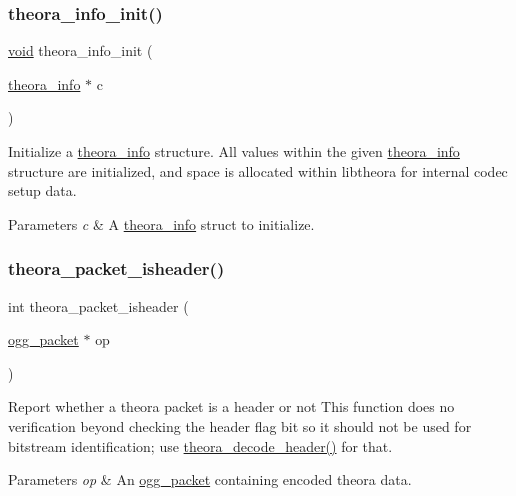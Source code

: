 \subsubsection{\texorpdfstring{theora\+\_\+info\+\_\+init()}{theora\_info\_init()}}
{\footnotesize\ttfamily \hyperlink{png_8h_ac9c84fa68bbad002983e35ce3663c686}{void} theora\+\_\+info\+\_\+init (\begin{DoxyParamCaption}\item[{\hyperlink{structtheora__info}{theora\+\_\+info} $\ast$}]{c }\end{DoxyParamCaption})}

Initialize a \hyperlink{structtheora__info}{theora\+\_\+info} structure. All values within the given \hyperlink{structtheora__info}{theora\+\_\+info} structure are initialized, and space is allocated within libtheora for internal codec setup data. 
\begin{DoxyParams}{Parameters}
{\em c} & A \hyperlink{structtheora__info}{theora\+\_\+info} struct to initialize. \\
\hline
\end{DoxyParams}
\mbox{\label{group__oldfuncs_gab969f9d0407683f0e5abe73d0839a25b}} 
\subsubsection{\texorpdfstring{theora\+\_\+packet\+\_\+isheader()}{theora\_packet\_isheader()}}
{\footnotesize\ttfamily int theora\+\_\+packet\+\_\+isheader (\begin{DoxyParamCaption}\item[{\hyperlink{structogg__packet}{ogg\+\_\+packet} $\ast$}]{op }\end{DoxyParamCaption})}

Report whether a theora packet is a header or not This function does no verification beyond checking the header flag bit so it should not be used for bitstream identification; use \hyperlink{group__oldfuncs_ga02915e63c1bd733ee291f577a8b75a82}{theora\+\_\+decode\+\_\+header()} for that.


\begin{DoxyParams}{Parameters}
{\em op} & An \hyperlink{structogg__packet}{ogg\+\_\+packet} containing encoded theora data. \\
\hline
\end{DoxyParams}

